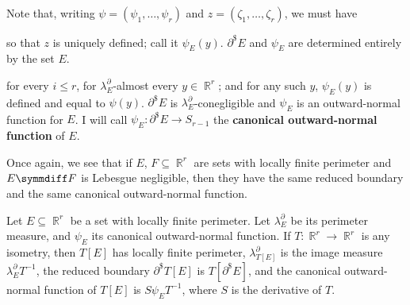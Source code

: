 \noindent{}Note that, writing
$\psi=(\psi_1,\ldots,\psi_r)$ and $z=(\zeta_1,\ldots,\zeta_r)$, we must
have


\noindent so that $z$ is uniquely defined;  call it $\psi_E(y)$.
$\partial^{\$}E$ and $\psi_E$ are determined
entirely by the set $E$.



\noindent for every $i\le r$, for $\lambda^{\partial}_E$-almost every
$y\in\BbbR^r$;  and for any such $y$, $\psi_E(y)$ is defined and equal
to $\psi(y)$.    $\partial^{\$}E$ is
$\lambda^{\partial}_E$-conegligible and $\psi_E$ is an outward-normal
function for $E$.   I will call $\psi_E:\partial^{\$}E\to S_{r-1}$ the
{\bf canonical outward-normal function} of $E$.

Once again, we see that if $E$, $F\subseteq\BbbR^r$ are sets with locally
finite perimeter and $E\symmdiff F$ is Lebesgue negligible, then
they have the same reduced boundary and the same canonical outward-normal
function.

 Let
$E\subseteq\BbbR^r$ be a set with locally finite perimeter.   Let
$\lambda^{\partial}_E$ be its perimeter measure, and $\psi_E$ its canonical
outward-normal function.   If $T:\BbbR^r\to\BbbR^r$ is any
isometry, then $T[E]$ has locally finite perimeter,
$\lambda^{\partial}_{T[E]}$ is the image measure
$\lambda^{\partial}_ET^{-1}$,
the reduced boundary $\partial^{\$}T[E]$ is $T[\partial^{\$}E]$,
and the canonical
outward-normal function of $T[E]$ is $S\psi_ET^{-1}$,
where $S$ is the derivative of $T$.

